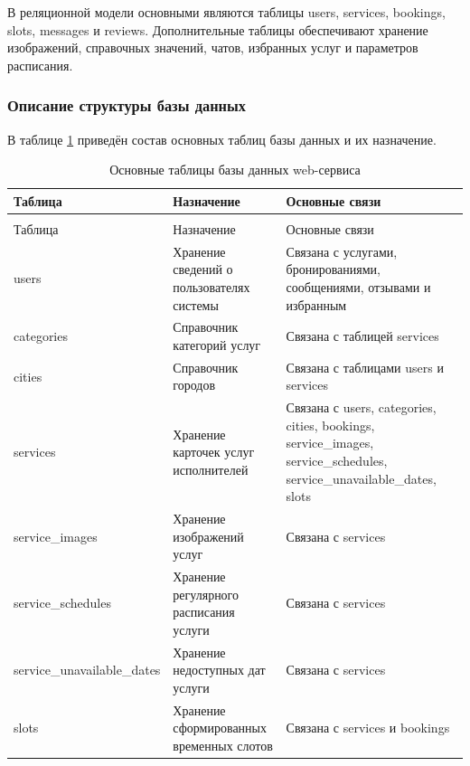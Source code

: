 В реляционной модели основными являются таблицы users, services, bookings, slots, messages и reviews. Дополнительные таблицы обеспечивают хранение изображений, справочных значений, чатов, избранных услуг и параметров расписания.

\subsubsection{Описание структуры базы данных}

\setlength{\LTleft}{0pt}
\setlength{\LTright}{0pt}
\setlength{\tabcolsep}{3pt}
\renewcommand{\arraystretch}{1.1}

В таблице \ref{dbtables:table} приведён состав основных таблиц базы данных и их назначение.

\begin{longtable}{|>{\raggedright\arraybackslash}p{3.9cm}|>{\raggedright\arraybackslash}p{4.5cm}|>{\raggedright\arraybackslash}p{5.9cm}|}
	\caption{Основные таблицы базы данных web-сервиса}\label{dbtables:table} \\ \hline
	\centering Таблица & \centering Назначение & \centering\arraybackslash Основные связи \\ \hline
	\endfirsthead	
	\multicolumn{3}{l}{Продолжение таблицы \ref{dbtables:table}} \\ \hline
	\centering Таблица & \centering Назначение & \centering\arraybackslash Основные связи \\ \hline
	\endhead
	users & Хранение сведений о пользователях системы & Связана с услугами, бронированиями, сообщениями, отзывами и избранным \\ \hline
	categories & Справочник категорий услуг & Связана с таблицей services \\ \hline
	cities & Справочник городов & Связана с таблицами users и services \\ \hline
	services & Хранение карточек услуг исполнителей & Связана с users, categories, cities, bookings, service\_images, service\_schedules, service\_unavailable\_dates, slots \\ \hline
	service\_images & Хранение изображений услуг & Связана с services \\ \hline
	service\_schedules & Хранение регулярного расписания услуги & Связана с services \\ \hline
	service\_unavailable\newline\_dates & Хранение недоступных дат услуги & Связана с services \\ \hline
	slots & Хранение сформированных временных слотов & Связана с services и bookings \\ \hline

\end{longtable}
